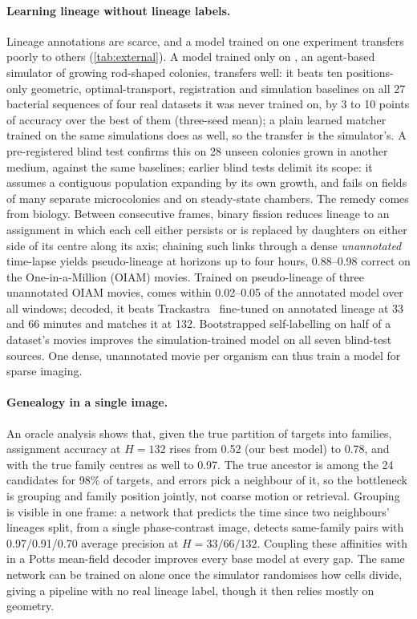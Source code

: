 \paragraph{Learning lineage without lineage labels.}
Lineage annotations are scarce, and a model trained on one experiment transfers poorly to others (\cref{tab:external}).
A model trained only on \rodsim, an agent-based simulator of growing rod-shaped colonies, transfers well: it beats ten positions-only geometric, optimal-transport, registration and simulation baselines on all 27 bacterial sequences of four real datasets it was never trained on, by 3 to 10 points of accuracy over the best of them (three-seed mean); a plain learned matcher trained on the same simulations does as well, so the transfer is the simulator's.
A pre-registered blind test confirms this on 28 unseen colonies grown in another medium, against the same baselines; earlier blind tests delimit its scope: it assumes a contiguous population expanding by its own growth, and fails on fields of many separate microcolonies and on steady-state chambers.
The remedy comes from biology.
Between consecutive frames, binary fission reduces lineage to an assignment in which each cell either persists or is replaced by daughters on either side of its centre along its axis; chaining such links through a dense \emph{unannotated} time-lapse yields pseudo-lineage at horizons up to four hours, 0.88--0.98 correct on the One-in-a-Million (OIAM) movies.
Trained on pseudo-lineage of three unannotated OIAM movies, \ours comes within 0.02--0.05 of the annotated model over all windows; decoded, it beats Trackastra~\cite{gallusser2024trackastra} fine-tuned on annotated lineage at 33 and 66 minutes and matches it at 132.
Bootstrapped self-labelling on half of a dataset's movies improves the simulation-trained model on all seven blind-test sources.
One dense, unannotated movie per organism can thus train a model for sparse imaging.

\paragraph{Genealogy in a single image.}
An oracle analysis shows that, given the true partition of targets into families, assignment accuracy at $H{=}132$ rises from 0.52 (our best model) to 0.78, and with the true family centres as well to 0.97. The true ancestor is among the 24 candidates for 98\% of targets, and errors pick a neighbour of it, so the bottleneck is grouping and family position jointly, not coarse motion or retrieval.
Grouping is visible in one frame: a network that predicts the time since two neighbours' lineages split, from a single phase-contrast image, detects same-family pairs with 0.97/0.91/0.70 average precision at $H{=}33/66/132$.
Coupling these affinities with \ours in a Potts mean-field decoder improves every base model at every gap.
The same network can be trained on \rodsim alone once the simulator randomises how cells divide, giving a pipeline with no real lineage label, though it then relies mostly on geometry.

